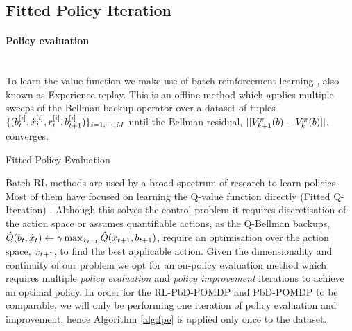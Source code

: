 \subsection{Fitted Policy Iteration}\label{sec:fpe}

\paragraph{Policy evaluation}\\

To learn the value function we make use of batch reinforcement learning \citep{EGW05}, also known as Experience replay.
This is an offline method which applies multiple sweeps of the Bellman backup operator 
over a dataset of tuples $\{(b^{[i]}_t,\dot{x}^{[i]}_t,r^{[i]}_{t},b^{[i]}_{t+1})\}_{i=1,\cdots,M}$ until the Bellman residual,
${||V^{\pi}_{k+1}(b) - V^{\pi}_{k}(b)||}$, converges. 

\begin{center}
\begin{minipage}{.65\linewidth}
\begin{algorithm}[H]
\label{alg:fpe}
\BlankLine
{}
\caption{Fitted Policy Evaluation}
\end{algorithm} 
\end{minipage}
\end{center}
Batch RL methods are used by a broad spectrum of research to learn policies. 
Most of them have focused on learning the Q-value function directly (Fitted Q-Iteration) 
\citep{NIPS2008_3501,EGW05,Riedmiller2005}. Although this solves the control problem it requires discretisation 
of the action space or assumes quantifiable actions, as the 
Q-Bellman backups, ${\hat{Q}(b_t,\dot{x}_t) \leftarrow \gamma \max_{\dot{x}_{t+1}} \hat{Q}(\dot{x}_{t+1},b_{t+1})}$, 
require an optimisation over the action space, $\dot{x}_{t+1}$, to find the best applicable action. 
Given the dimensionality and continuity of our problem we opt for an on-policy evaluation method
which requires multiple \textit{policy evaluation} and \textit{policy improvement} iterations to achieve an optimal policy.
In order for the RL-PbD-POMDP and PbD-POMDP to be comparable, we will only be performing one iteration of policy evaluation
and improvement, hence Algorithm \ref{alg:fpe} is applied only once to the dataset.

